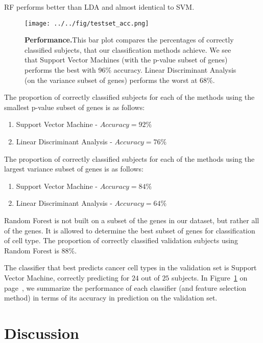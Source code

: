 RF performs better than LDA and almost identical to SVM.

\begin{figure}[H]
  \centering
    \texttt{[image: ../../fig/testset\_acc.png]}
\caption{\textbf{Performance.}This bar plot compares the percentages of correctly
  classified subjects, that our classification methods achieve. We see that
  Support Vector Machines (with the p-value subset of genes) performs the best
  with 96\% accuracy. Linear Discriminant Analysis (on the variance subset of
  genes) performs the worst at 68\%.}
   \label{fig:performance}
\end{figure}

The proportion of correctly classified subjects for each of the methods using
the smallest p-value subset of genes is as follows:

\begin{enumerate}
\item Support Vector Machine - $Accuracy = 92\%$
\item Linear Discriminant Analysis - $Accuracy = 76\%$
\end{enumerate}

The proportion of correctly classified subjects for each of the methods using
the largest variance subset of genes is as follows:

\begin{enumerate}
\item Support Vector Machine - $Accuracy = 84\% $
\item Linear Discriminant Analysis - $Accuracy =64\% $
\end{enumerate}

Random Forest is not built on a subset of the genes in our dataset, but rather
all of the genes. It is allowed to determine the best subset of genes for
classification of cell type. The proportion of correctly classified validation
subjects using Random Forest is $88\%$.

The classifier that best predicts cancer cell types in the validation set is
Support Vector Machine, correctly predicting for $24$ out of $25$ subjects.
In Figure~\ref{fig:performance} on page~\pageref{fig:performance}, we
summarize the performance of each classifier (and feature selection
method) in terms of its accuracy in prediction on the validation set.


\section{Discussion}


